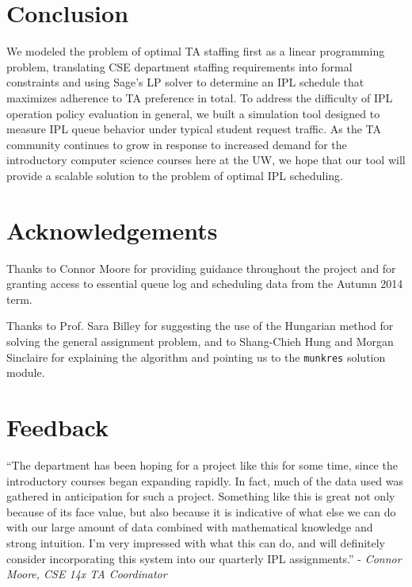 \documentclass{article}
\begin{document}
\begin{multicols}{2}
\section*{Conclusion}

We modeled the problem of optimal TA staffing first as a linear programming problem, translating CSE department staffing requirements into formal constraints and using Sage's LP solver to determine an IPL schedule that maximizes adherence to TA preference in total. To address the difficulty of IPL operation policy evaluation in general, we built a simulation tool designed to measure IPL queue behavior under typical student request traffic. As the TA community continues to grow in response to increased demand for the introductory computer science courses here at the UW, we hope that our tool will provide a scalable solution to the problem of optimal IPL scheduling.

\section*{Acknowledgements}

Thanks to Connor Moore for providing guidance throughout the project and for granting access to essential queue log and scheduling data from the Autumn 2014 term.

Thanks to Prof. Sara Billey for suggesting the use of the Hungarian method for solving the general assignment problem, and to Shang-Chieh Hung and Morgan Sinclaire for explaining the algorithm and pointing us to the \texttt{munkres} solution module.

\section*{Feedback}

``The department has been hoping for a project like this for some time, since the introductory courses began expanding rapidly. In fact, much of the data used was gathered in anticipation for such a project. Something like this is great not only because of its face value, but also because it is indicative of what else we can do with our large amount of data combined with mathematical knowledge and strong intuition. I'm very impressed with what this can do, and will definitely consider incorporating this system into our quarterly IPL assignments.'' - \textit{Connor Moore, CSE 14x TA Coordinator}





\end{multicols}
\end{document}
